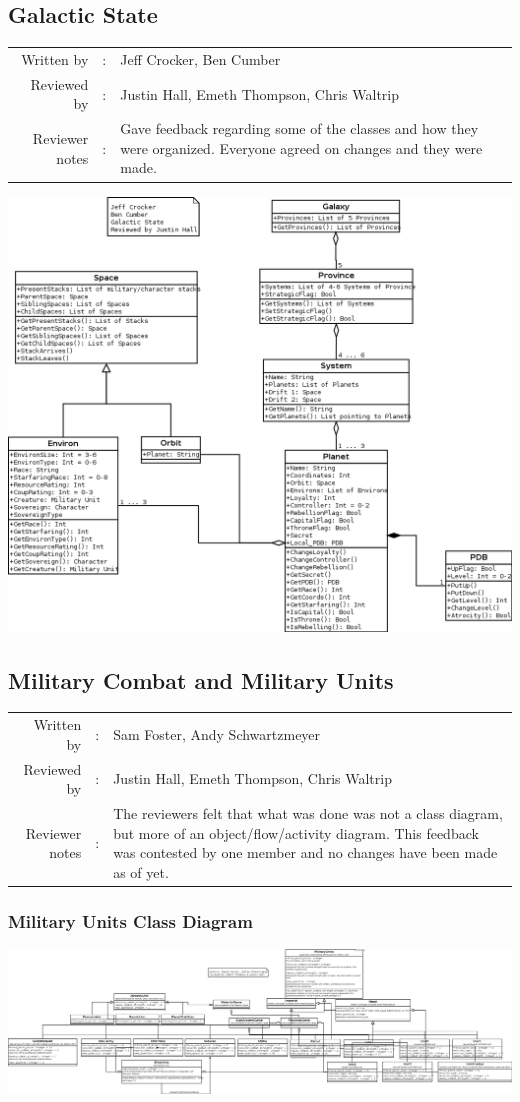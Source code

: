 \documentclass[12pt,letterpaper]{article}
\begin{document}
	\subsection{Galactic State}
	\begin{tabularx}{\linewidth}{rcX}
				Written by & : & Jeff Crocker, Ben Cumber \\
				Reviewed by & : & Justin Hall, Emeth Thompson, Chris Waltrip \\
				Reviewer notes & : & Gave feedback regarding some of the classes and how they were organized.  Everyone agreed on changes and they were made. 
	\end{tabularx}
		\includegraphics[width=\textwidth,height=\textheight,keepaspectratio]{./images/galactic_state}	
	\subsection{Military Combat and Military Units}
	\begin{tabularx}{\linewidth}{rcX}
				Written by & : & Sam Foster, Andy Schwartzmeyer \\
				Reviewed by & : & Justin Hall, Emeth Thompson, Chris Waltrip \\
				Reviewer notes & : & The reviewers felt that what was done was not a class diagram, but more of an object/flow/activity diagram.  This feedback was contested by one member and no changes have been made as of yet.
	\end{tabularx}
		\subsubsection{Military Units Class Diagram}
		\includegraphics[width=\textwidth,height=\textheight,keepaspectratio]{./images/military_units}
		
\end{document}
